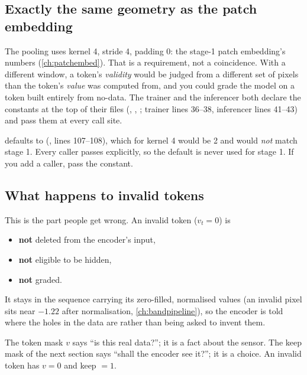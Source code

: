 \subsection{Exactly the same geometry as the patch embedding}

The pooling uses kernel 4, stride 4, padding 0: the stage-1 patch embedding's numbers
(\cref{ch:patchembed}). That is a requirement, not a coincidence. With a different window, a token's
\emph{validity} would be judged from a different set of pixels than the token's \emph{value} was
computed from, and you could grade the model on a token built entirely from no-data. The trainer and
the inferencer both declare the constants at the top of their files (,
, ; trainer lines 36--38, inferencer
 lines 41--43) and pass them at
every call site.

\begin{sourcenote}
 defaults  to 
(, lines 107--108), which for kernel 4 would be 2 and would \emph{not} match
stage 1. Every caller passes  explicitly, so the default is never used for stage 1. If
you add a caller, pass the constant.
\end{sourcenote}

\subsection{What happens to invalid tokens}

This is the part people get wrong. An invalid token ($v_t = 0$) is
\begin{itemize}
\item \textbf{not} deleted from the encoder's input,
\item \textbf{not} eligible to be hidden,
\item \textbf{not} graded.
\end{itemize}
It stays in the sequence carrying its zero-filled, normalised values (an invalid pixel sits near
$-1.22$ after normalisation, \cref{ch:bandpipeline}), so the encoder is told where the holes in the data
are rather than being asked to invent them.

\begin{keypoint}
The token mask $v$ says ``is this real data?''; it is a fact about the sensor. The keep mask of the
next section says ``shall the encoder see it?''; it is a choice. An invalid token has $v = 0$ and keep
$= 1$.
\end{keypoint}

